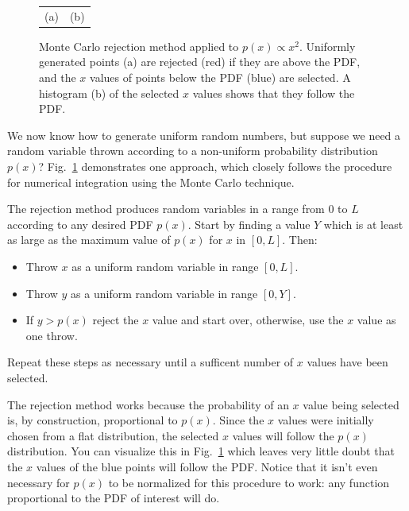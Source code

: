 \begin{figure}[htbp]
\begin{center}
\begin{tabular}{cc}
  (a) & (b) \\
 \end{tabular}
  \caption{Monte Carlo rejection method applied to $p(x) \propto
    x^2$. Uniformly generated points (a) are rejected (red) if they
    are above the PDF, and the $x$ values of points below the PDF
    (blue) are selected.  A histogram (b) of the selected $x$ values
    shows that they follow the PDF.}
  \label{fig:rejectmc}
\end{center}
\end{figure}

\noindent
We now know how to generate uniform random numbers, but suppose we
need a random variable thrown according to a non-uniform probability
distribution $p(x)$?  Fig.~\ref{fig:rejectmc} demonstrates one
approach, which closely follows the procedure for numerical
integration using the Monte Carlo technique.

The rejection method produces random variables in a range from 0 to $L$
according to any desired PDF $p(x)$.  Start by finding a value $Y$ which is at
least as large as the maximum value of $p(x)$ for $x$ in $[0,L]$.  Then:
\begin{itemize}
  \item Throw $x$ as a uniform random variable in range $[0, L]$.
  \item Throw $y$ as a uniform random variable in range $[0, Y]$.
  \item If $y > p(x)$ reject the $x$ value and start over, otherwise, use the $x$ value as one throw.
\end{itemize}
Repeat these steps as necessary until a sufficent number of $x$ values have been selected.

The rejection method works because the probability of an $x$ value
being selected is, by construction, proportional to $p(x)$.  Since the
$x$ values were initially chosen from a flat distribution, the
selected $x$ values will follow the $p(x)$ distribution.  You can
visualize this in Fig.~\ref{fig:rejectmc} which leaves very little
doubt that the $x$ values of the blue points will follow the PDF.
Notice that it isn't even necessary for $p(x)$ to be normalized for
this procedure to work: any function proportional to the PDF of interest will do.

